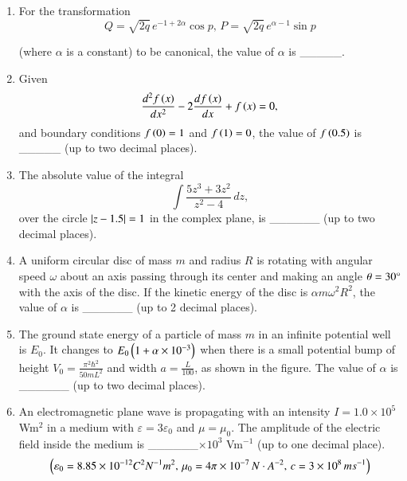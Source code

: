 \documentclass[journal,9pt,onecolumn]{IEEEtran}
\begin{document}
\begin{enumerate}

\item For the transformation $$Q = \sqrt{2q} \, e^{-1+2\alpha} \cos p,\, P = \sqrt{2q} \, e^{\alpha-1} \sin p$$

(where $\alpha$ is a constant) to be canonical, the value of $\alpha$ is \_\_\_\_\_.
\hfill {}

\item Given $$\frac{d^2 f\left(x\right)}{dx^2} - 2 \frac{df\left(x\right)}{dx} + f\left(x\right) = 0,$$
and boundary conditions $f\left(0\right) = 1$ and $f\left(1\right) = 0$, the value of $f\left(0.5\right)$ is \_\_\_\_\_ (up to two decimal places).\hfill {}



\item The absolute value of the integral $$\int \frac{5z^3 + 3z^2}{z^2 - 4} \, dz,$$
over the circle $\left\vert z - 1.5\right\vert = 1$ in the complex plane, is \_\_\_\_\_\_ (up to two decimal places).\hfill {}


\item A uniform circular disc of mass $m$ and radius $R$ is rotating with angular speed $\omega$ about an axis passing through its center and making an angle $\theta = 30\degree$ with the axis of the disc. If the kinetic energy of the disc is $\alpha m \omega^2 R^2$, the value of $\alpha$ is \_\_\_\_\_\_ (up to 2 decimal places).\hfill {}
\begin{center}
    
\end{center}

\item The ground state energy of a particle of mass $m$ in an infinite potential well is $E_0$. It changes to $E_0 \left(1 + \alpha \times 10^{-3}\right)$ when there is a small potential bump of height $V_0 = \frac{\pi^2 \hbar^2}{50 m L^2}$ and width $a = \frac{L}{100}$, as shown in the figure. The value of $\alpha$ is \_\_\_\_\_\_ (up to two decimal places).\hfill {}
\begin{center}
    
\end{center}

\item An electromagnetic plane wave is propagating with an intensity $I = 1.0 \times 10^5$ Wm$^2$ in a medium with $\varepsilon = 3\varepsilon_0$ and $\mu = \mu_0$. The amplitude of the electric field inside the medium is \_\_\_\_\_\_$ \times 10^3$ Vm$^{-1}$ (up to one decimal place).\hfill {}
$$
\left(\varepsilon_0 = 8.85 \times 10^{-12} {C}^2N^{-1}m^2, \, \mu_0 = 4\pi \times 10^{-7} \, N\cdot A^{-2}, \, c = 3 \times 10^8 \, ms^{-1}\right)
$$


\end{enumerate}
\end{document}
